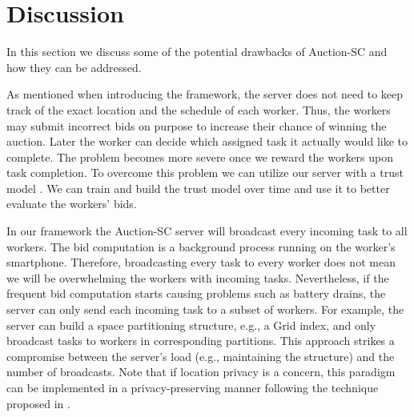 \section{Discussion}
\label{sec:discuss}

In this section we discuss some of the potential drawbacks of Auction-SC and how they can be addressed.

As mentioned when introducing the framework, the server does not need to keep track of the exact location and the schedule of each worker. Thus, the workers may submit incorrect bids on purpose to increase their chance of winning the auction. Later the worker can decide which assigned task it actually would like to complete. The problem becomes more severe once we reward the workers upon task completion. To overcome this problem we can utilize our server with a trust model \cite{Ye15}. We can train and build the trust model over time and use it to better evaluate the workers' bids.

In our framework the Auction-SC server will broadcast every incoming task to all workers. The bid computation is a background process running on the worker's smartphone. Therefore, broadcasting every task to every worker does not mean we will be overwhelming the workers with incoming tasks. Nevertheless, if the frequent bid computation starts causing problems such as battery drains, the server can only send each incoming task to a subset of workers.
For example, the server can build a space partitioning structure, e.g., a Grid index, and only broadcast tasks to workers in corresponding partitions.  This approach strikes a compromise between the server's load (e.g., maintaining the structure) and the number of broadcasts. Note that if location privacy is a concern, this paradigm can be implemented in a privacy-preserving manner following  the technique  proposed in \cite{To14}.